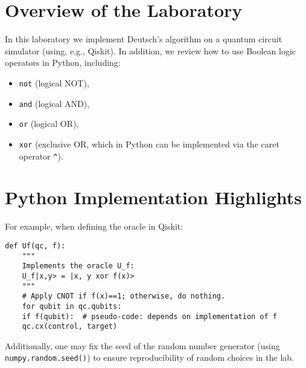\documentclass[11pt,oneside]{book}
\theoremstyle{remark}
\begin{document}
	\section{Overview of the Laboratory}
	In this laboratory we implement Deutsch's algorithm on a quantum circuit simulator (using, e.g., Qiskit). In addition, we review how to use Boolean logic operators in Python, including:
	\begin{itemize}[leftmargin=*, labelsep=5mm]
		\item \texttt{not} (logical NOT),
		\item \texttt{and} (logical AND),
		\item \texttt{or} (logical OR),
		\item \texttt{xor} (exclusive OR, which in Python can be implemented via the caret operator \texttt{\^}).
	\end{itemize}
	
	\section{Python Implementation Highlights}
	For example, when defining the oracle in Qiskit:
\begin{verbatim}
def Uf(qc, f):
	"""
	Implements the oracle U_f:
	U_f|x,y> = |x, y xor f(x)>
	"""
	# Apply CNOT if f(x)==1; otherwise, do nothing.
	for qubit in qc.qubits:
	if f(qubit):  # pseudo-code: depends on implementation of f
	qc.cx(control, target)
\end{verbatim}
	Additionally, one may fix the seed of the random number generator (using \texttt{numpy.random.seed()}) to ensure reproducibility of random choices in the lab.
	
\end{document}
